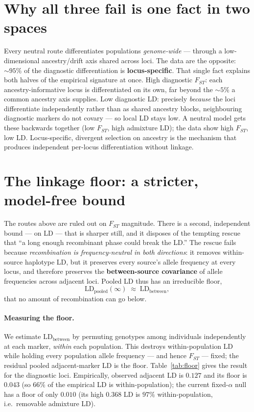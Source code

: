 \documentclass[11pt,a4paper]{article}
\begin{document}
\section{Why all three fail is one fact in two spaces}
Every neutral route differentiates populations \emph{genome-wide} --- through a
low-dimensional ancestry/drift axis shared across loci. The data are the opposite:
$\sim\!95\%$ of the diagnostic differentiation is \textbf{locus-specific}. That single
fact explains both halves of the empirical signature at once. High diagnostic $F_{ST}$:
each ancestry-informative locus is differentiated on its own, far beyond the $\sim\!5\%$
a common ancestry axis supplies. Low diagnostic LD: precisely \emph{because} the loci
differentiate independently rather than as shared ancestry blocks, neighbouring
diagnostic markers do not covary --- so local LD stays low. A neutral model gets these
backwards together (low $F_{ST}$, high admixture LD); the data show high $F_{ST}$, low
LD. Locus-specific, divergent selection on ancestry is the mechanism that produces
independent per-locus differentiation without linkage.

\section{The linkage floor: a stricter, model-free bound}
The routes above are ruled out on $F_{ST}$ magnitude. There is a second, independent
bound --- on LD --- that is sharper still, and it disposes of the tempting rescue that
``a long enough recombinant phase could break the LD.'' The rescue fails because
\emph{recombination is frequency-neutral in both directions}: it removes within-source
haplotype LD, but it preserves every source's allele frequency at every locus, and
therefore preserves the \textbf{between-source covariance} of allele frequencies across
adjacent loci. Pooled LD thus has an irreducible floor,
\[ \mathrm{LD_{pooled}(\infty)} \;\approx\; \mathrm{LD_{between}}, \]
that no amount of recombination can go below.

\paragraph{Measuring the floor.} We estimate $\mathrm{LD_{between}}$ by permuting
genotypes among individuals independently at each marker, \emph{within} each population.
This destroys within-population LD while holding every population allele frequency ---
and hence $F_{ST}$ --- fixed; the residual pooled adjacent-marker LD is the floor.
Table~\ref{tab:floor} gives the result for the diagnostic loci. Empirically, observed
adjacent LD is $0.127$ and its floor is $0.043$ (so $66\%$ of the empirical LD is
within-population); the current fixed-$\alpha$ null has a floor of only $0.010$
(its high $0.368$ LD is $97\%$ within-population, i.e.\ removable admixture LD).
\end{document}
